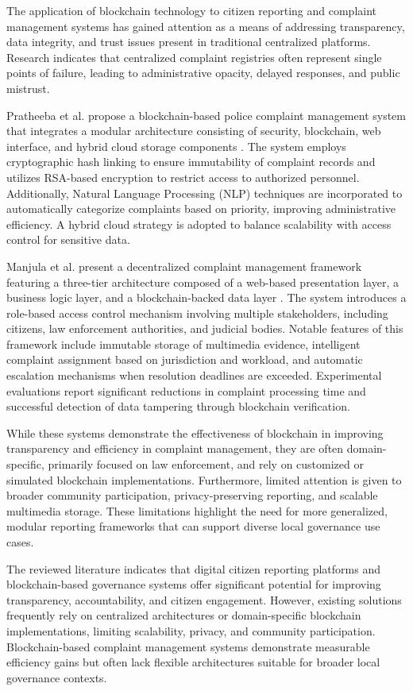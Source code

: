 The application of blockchain technology to citizen reporting and complaint management systems has gained attention as a means of addressing transparency, data integrity, and trust issues present in traditional centralized platforms. Research indicates that centralized complaint registries often represent single points of failure, leading to administrative opacity, delayed responses, and public mistrust.

Pratheeba et al. propose a blockchain-based police complaint management system that integrates a modular architecture consisting of security, blockchain, web interface, and hybrid cloud storage components \cite{mohan2025police}. The system employs cryptographic hash linking to ensure immutability of complaint records and utilizes RSA-based encryption to restrict access to authorized personnel. Additionally, Natural Language Processing (NLP) techniques are incorporated to automatically categorize complaints based on priority, improving administrative efficiency. A hybrid cloud strategy is adopted to balance scalability with access control for sensitive data.

Manjula et al. present a decentralized complaint management framework featuring a three-tier architecture composed of a web-based presentation layer, a business logic layer, and a blockchain-backed data layer \cite{zhai2022trust}. The system introduces a role-based access control mechanism involving multiple stakeholders, including citizens, law enforcement authorities, and judicial bodies. Notable features of this framework include immutable storage of multimedia evidence, intelligent complaint assignment based on jurisdiction and workload, and automatic escalation mechanisms when resolution deadlines are exceeded. Experimental evaluations report significant reductions in complaint processing time and successful detection of data tampering through blockchain verification.

While these systems demonstrate the effectiveness of blockchain in improving transparency and efficiency in complaint management, they are often domain-specific, primarily focused on law enforcement, and rely on customized or simulated blockchain implementations. Furthermore, limited attention is given to broader community participation, privacy-preserving reporting, and scalable multimedia storage. These limitations highlight the need for more generalized, modular reporting frameworks that can support diverse local governance use cases.

The reviewed literature indicates that digital citizen reporting platforms and blockchain-based governance systems offer significant potential for improving transparency, accountability, and citizen engagement. However, existing solutions frequently rely on centralized architectures or domain-specific blockchain implementations, limiting scalability, privacy, and community participation. Blockchain-based complaint management systems demonstrate measurable efficiency gains but often lack flexible architectures suitable for broader local governance contexts.

